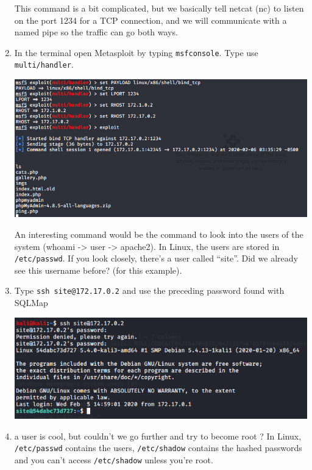 \documentclass{article}
\begin{document}
\begin{enumerate}
    This command is a bit complicated, but we basically tell netcat (nc) to listen on the port 1234 for a TCP connection, and we will communicate with a named pipe so the traffic can go both ways.
    \newpage 
    \item In the terminal open Metasploit by typing \lstinline{msfconsole}. Type use \lstinline{multi/handler}.
    \begin{center}
    \includegraphics[scale=0.65]{imageTP/7.PNG}
\end{center}
    An interesting command would be the command to look into the users of the system (whoami -> user -> apache2). In Linux, the users are stored in \lstinline{/etc/passwd}. If you look closely, there’s a user called “site”. Did we already see this username before? (for this example).
    \item Type \lstinline{ssh site@172.17.0.2} and use the preceding password found with SQLMap
    \begin{center}
    \includegraphics[scale=0.65]{imageTP/8.PNG}
    \end{center}
    \item a user is cool, but couldn’t we go further and try to become root ? In Linux, \lstinline{/etc/passwd} contains the users, \lstinline{/etc/shadow} contains the hashed passwords and you can’t access \lstinline{/etc/shadow} unless you’re root.\\
    

\end{enumerate}
\end{document}
